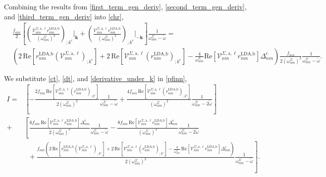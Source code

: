 \documentclass[letterpaper,aps]{revtex4}
\begin{document}
Combining the results from \eqref{first_term_gen_deriv},
\eqref{second_term_gen_deriv}, and \eqref{third_term_gen_deriv}
into \eqref{chr},
\begin{align}\label{derivative_under_k}
&   \frac{f_{mn}}{2}\left[\left(\frac{\mathcal{V}^{\Sigma,\text{a},\ell}_{mn}
    r^{\text{LDA,b}}_{nm}}{(\omega^\Sigma_{nm})^2}\right)
    _{;k^{\text{c}}}\vert_{\mathbf{k}} 
+   \left(\frac{\mathcal{V}^{\Sigma,\text{a},\ell}_{mn}
    r^{\text{LDA,b}}_{nm}}{(\omega^\Sigma_{nm})^2}\right)
    _{;k^{\text{c}}}\vert_{-\mathbf{k}}\right]\frac{1}{\omega^\Sigma_{nm}-\tilde\omega}
=   \nonumber\\
&   \left(2\,\mathrm{Re}\left[r^{\text{LDA,b}}_{nm}
    \left(\mathcal{V}^{\Sigma,\text{a},\ell}_{mn}\right)_{;k^{\text{c}}}\right]
+   2\,\mathrm{Re}\left[\mathcal{V}^{\Sigma,\text{a},\ell}_{mn}
    \left(r^{\text{LDA,b}}_{nm}\right)_{;k^{\text{c}}}\right] 
-   \frac{4}{\omega^{\Sigma}_{nm}}\mathrm{Re}
    \left[\mathcal{V}^{\Sigma,\text{a},\ell}_{nm}r^{\text{LDA,b}}_{mn}\right]
    \Delta_{nm}^{\text{c}}\right)\frac{f_{mn}}{2(\omega^{\Sigma}_{nm})^{2}}
    \frac{1}{\omega^\Sigma_{nm}-\tilde\omega}
.
\end{align}

We substitute \eqref{ct}, \eqref{dt}, and \eqref{derivative_under_k} in 
\eqref{pfinn},
\begin{align*}
I
=   &\left[-\frac{2f_{mn}\,\mathrm{Re}
    \left[\mathcal{V}^{\Sigma,\text{a},\ell}_{mn}
    \left(r^{\text{LDA,b}}_{nm}\right)_{;k^{\text{c}}}\right]}
    {2(\omega^{\Sigma}_{nm})^{2}}\frac{1}{\omega^{\Sigma}_{nm}-\tilde\omega} 
+   \frac{4f_{mn}\,\mathrm{Re}\left[\mathcal{V}^{\Sigma,\text{a},\ell}_{mn}
    \left(r^{\text{LDA,b}}_{nm}\right)_{;k^{\text{c}}}\right]}
    {(\omega^{\Sigma}_{nm})^{2}}\frac{1}{\omega^{\Sigma}_{nm}-2\tilde\omega}\right]\nonumber\\
+   &\left[\frac{6f_{mn}\,\mathrm{Re}
    \left[\mathcal{V}^{\Sigma,\text{a},\ell}_{mn}r^{\text{LDA,b}}_{nm}\right]
    \Delta^{\text{c}}_{nm}}{2(\omega^{\Sigma}_{nm})^{3}}
    \frac{1}{\omega^{\Sigma}_{nm}-\tilde\omega} 
-   \frac{8f_{mn}\,\mathrm{Re}
    \left[\mathcal{V}^{\Sigma,\text{a},\ell}_{mn}r^{\text{LDA,b}}_{nm}\right]
    \Delta^{\text{c}}_{nm}}{(\omega^{\Sigma}_{nm})^{3}}
    \frac{1}{\omega^{\Sigma}_{nm}-2\tilde\omega}\right.\nonumber\\
&\,\,\,+ 
    \left.\frac{f_{mn}\left(2\,\mathrm{Re}\left[r^{\text{LDA,b}}_{nm}
    \left(\mathcal{V}^{\Sigma,\text{a},\ell}_{mn}\right)_{;k^{\text{c}}}\right]
+   2\,\mathrm{Re}\left[\mathcal{V}^{\Sigma,\text{a},\ell}_{mn}
    \left(r^{\text{LDA,b}}_{nm}\right)_{;k^{\text{c}}}\right] 
-   \frac{4}{\omega^{\Sigma}_{nm}}\,\mathrm{Re}
    \left[\mathcal{V}^{\Sigma,\text{a},\ell}_{nm}r^{\text{LDA,b}}_{mn}\right]
    \Delta_{nm}^{\text{c}}\right)}{2(\omega^{\Sigma}_{nm})^{2}}
    \frac{1}{\omega^\Sigma_{nm}-\tilde\omega}\right]
.
\end{align*}
\end{document}
